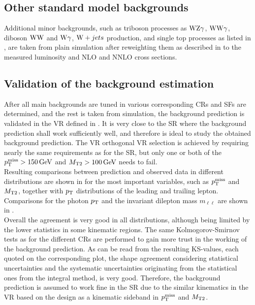 \subsection{Other standard model backgrounds}
Additional minor backgrounds, such as triboson processes as $\mathrm{W}\mathrm{Z}\gamma$, $\mathrm{W}\mathrm{W}\gamma$, diboson $\mathrm{W}\mathrm{W}$ and $\mathrm{W}\gamma$, $\mathrm{W}+jets$ production, and single top processes as listed in , are taken from plain simulation after reweighting them as described in  to the measured luminosity and NLO and NNLO cross sections.

\FloatBarrier
\subsection{Validation of the background estimation}\label{sec:Validation}
After all main backgrounds are tuned in various corresponding CRs and SFs are determined, and the rest is taken from simulation, the background prediction is validated in the VR defined in . It is very close to the SR where the background prediction shall work sufficiently well, and therefore is ideal to study the obtained background prediction. The VR orthogonal VR selection is achieved by requiring nearly the same requirements as for the SR, but only one or both of the $p_{\mathrm{T}}^\text{miss}>150\,\text{Ge\hspace{-.08em}V}$ and $M_{\mathrm{T2}}>100\,\text{Ge\hspace{-.08em}V}$ needs to fail.\\
Resulting comparisons between prediction and observed data in different distributions are shown in  for the most important variables, such as $p_{\mathrm{T}}^\text{miss}$ and $M_{\mathrm{T2}}$, together with $p_{\mathrm{T}}$ distributions of the leading and trailing lepton. Comparisons for the photon $p_{\mathrm{T}}$ and the invariant dilepton mass $m_{\ell\ell}$ are shown in .\\
Overall the agreement is very good in all distributions, although being limited by the lower statistics in some kinematic regions. The same Kolmogorov-Smirnov tests as for the different CRs are performed to gain more trust in the working of the background prediction. As can be read from the resulting KS-values, each quoted on the corresponding plot, the shape agreement considering statistical uncertainties and the systematic uncertainties originating from the statistical ones from the integral method, is very good. Therefore, the background prediction is assumed to work fine in the SR due to the similar kinematics in the VR based on the design as a kinematic sideband in $p_{\mathrm{T}}^\text{miss}$ and $M_{\mathrm{T2}}$.
